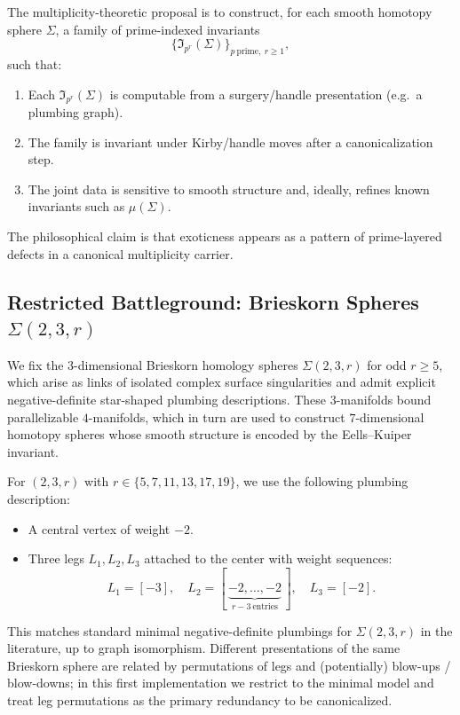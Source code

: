 \documentclass[11pt]{article}
\begin{document}
The multiplicity-theoretic proposal is to construct, for each smooth homotopy sphere $\Sigma$, a family of prime-indexed invariants
\[
  \bigl\{\mathfrak I_{p^r}(\Sigma)\bigr\}_{p\ \text{prime},\ r\ge 1},
\]
such that:
\begin{enumerate}[label=(\roman*),leftmargin=1.5em]
  \item Each $\mathfrak I_{p^r}(\Sigma)$ is computable from a surgery/handle presentation (e.g.\ a plumbing graph).
  \item The family is invariant under Kirby/handle moves after a canonicalization step.
  \item The joint data is sensitive to smooth structure and, ideally, refines known invariants such as $\mu(\Sigma)$.
\end{enumerate}
The philosophical claim is that exoticness appears as a pattern of prime-layered defects in a canonical multiplicity carrier.\cite{exotic-mult}

\subsection{Restricted Battleground: Brieskorn Spheres \texorpdfstring{$\Sigma(2,3,r)$}{Σ(2,3,r)}}

We fix the $3$-dimensional Brieskorn homology spheres $\Sigma(2,3,r)$ for odd $r\ge 5$, which arise as links of isolated complex surface singularities and admit explicit negative-definite star-shaped plumbing descriptions.\cite{exotic-mult} These $3$-manifolds bound parallelizable $4$-manifolds, which in turn are used to construct $7$-dimensional homotopy spheres whose smooth structure is encoded by the Eells--Kuiper invariant.

For $(2,3,r)$ with $r\in\{5,7,11,13,17,19\}$, we use the following plumbing description:

\begin{itemize}[leftmargin=1.5em]
  \item A central vertex of weight $-2$.
  \item Three legs $L_1,L_2,L_3$ attached to the center with weight sequences:
  \[
    L_1 = [-3],\quad
    L_2 = [\,\underbrace{-2,\dots,-2}_{r-3\ \text{entries}}\,],\quad
    L_3 = [-2].
  \]
\end{itemize}

This matches standard minimal negative-definite plumbings for $\Sigma(2,3,r)$ in the literature, up to graph isomorphism.\cite{exotic-mult} Different presentations of the same Brieskorn sphere are related by permutations of legs and (potentially) blow-ups / blow-downs; in this first implementation we restrict to the minimal model and treat leg permutations as the primary redundancy to be canonicalized.
\end{document}
